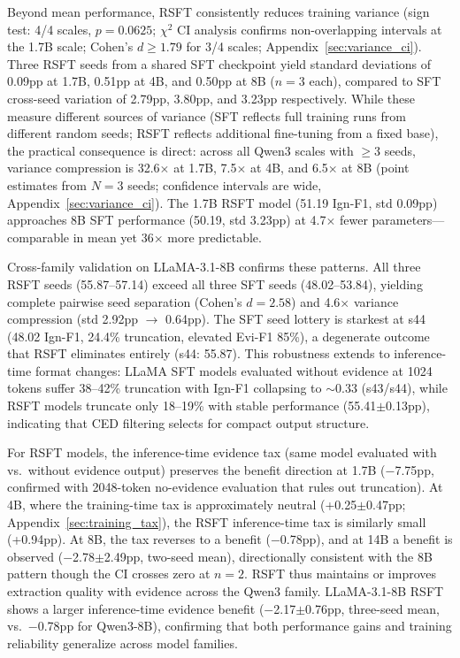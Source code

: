 Beyond mean performance, RSFT consistently reduces training variance (sign test: 4/4 scales, $p{=}0.0625$; $\chi^2$ CI analysis confirms non-overlapping intervals at the 1.7B scale; Cohen's $d \geq 1.79$ for 3/4 scales; Appendix~\ref{sec:variance_ci}). Three RSFT seeds from a shared SFT checkpoint yield standard deviations of 0.09pp at 1.7B, 0.51pp at 4B, and 0.50pp at 8B ($n{=}3$ each), compared to SFT cross-seed variation of 2.79pp, 3.80pp, and 3.23pp respectively. While these measure different sources of variance (SFT reflects full training runs from different random seeds; RSFT reflects additional fine-tuning from a fixed base), the practical consequence is direct: across all Qwen3 scales with $\geq$3 seeds, variance compression is 32.6$\times$ at 1.7B, 7.5$\times$ at 4B, and 6.5$\times$ at 8B (point estimates from $N{=}3$ seeds; confidence intervals are wide, Appendix~\ref{sec:variance_ci}). The 1.7B RSFT model (51.19 Ign-F1, std 0.09pp) approaches 8B SFT performance (50.19, std 3.23pp) at 4.7$\times$ fewer parameters---comparable in mean yet 36$\times$ more predictable.

Cross-family validation on LLaMA-3.1-8B confirms these patterns. All three RSFT seeds (55.87--57.14) exceed all three SFT seeds (48.02--53.84), yielding complete pairwise seed separation (Cohen's $d{=}2.58$) and 4.6$\times$ variance compression (std 2.92pp $\to$ 0.64pp). The SFT seed lottery is starkest at s44 (48.02 Ign-F1, 24.4\% truncation, elevated Evi-F1 85\%), a degenerate outcome that RSFT eliminates entirely (s44: 55.87). This robustness extends to inference-time format changes: LLaMA SFT models evaluated without evidence at 1024 tokens suffer 38--42\% truncation with Ign-F1 collapsing to ${\sim}$0.33 (s43/s44), while RSFT models truncate only 18--19\% with stable performance (55.41$\pm$0.13pp), indicating that CED filtering selects for compact output structure.

For RSFT models, the inference-time evidence tax (same model evaluated with vs.\ without evidence output) preserves the benefit direction at 1.7B ($-$7.75pp, confirmed with 2048-token no-evidence evaluation that rules out truncation). At 4B, where the training-time tax is approximately neutral (+0.25$\pm$0.47pp; Appendix~\ref{sec:training_tax}), the RSFT inference-time tax is similarly small (+0.94pp). At 8B, the tax reverses to a benefit ($-$0.78pp), and at 14B a benefit is observed ($-$2.78$\pm$2.49pp, two-seed mean), directionally consistent with the 8B pattern though the CI crosses zero at $n{=}2$. RSFT thus maintains or improves extraction quality with evidence across the Qwen3 family. LLaMA-3.1-8B RSFT shows a larger inference-time evidence benefit ($-$2.17$\pm$0.76pp, three-seed mean, vs.\ $-$0.78pp for Qwen3-8B), confirming that both performance gains and training reliability generalize across model families.

